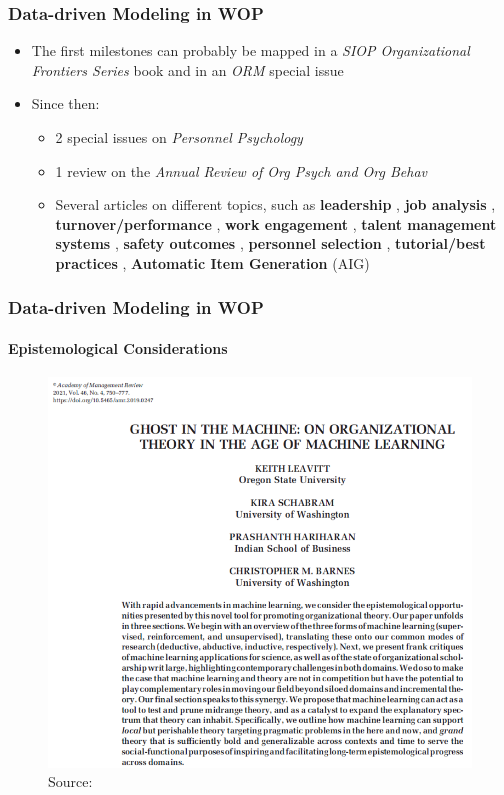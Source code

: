 \documentclass{beamer}
\begin{document}
\begin{frame}
	\frametitle{Data-driven Modeling in WOP}
	\begin{itemize}
		\item The first milestones can probably be mapped in a \textit{SIOP Organizational Frontiers Series} book {\scriptsize \parencite{tonidandel2016big}} and in an \textit{ORM} special issue {\scriptsize \parencite{tonidandel2018big}}
		\item Since then:
		\begin{itemize}
			\item 2 special issues on \textit{Personnel Psychology} {\scriptsize \parencite{campion2023machine, woo2024}}
			\item 1 review on the \textit{Annual Review of Org Psych and Org Behav}  {\scriptsize \parencite{oswald2020big}}
			\item Several articles on different topics, such as
			\textbf{leadership} {\scriptsize \parencite{tonidandel2022leadersh}}, 
			\textbf{job analysis} {\scriptsize \parencite{putka2023evaluating}}, 
			\textbf{turnover/performance}  {\scriptsize \parencite{sajjadiani2019using}}, 
			\textbf{work engagement} {\scriptsize \parencite{vanRoekel2024textWorkEngag}},
			\textbf{talent management systems} {\scriptsize \parencite{gonzalez2019talent}}, 
			\textbf{safety outcomes} {\scriptsize \parencite{kumar2024safety}}, 
			\textbf{personnel selection} {\scriptsize \parencite{landers2023simulation, koenig_Tonidandel2023}}, 
			\textbf{tutorial/best practices} {\scriptsize \parencite{putka2018modern, sheetal2023LongitudinalML}}, 
			\textbf{Automatic Item Generation} (AIG) {\scriptsize \parencite{lee2023AIG}}
		\end{itemize}
	\end{itemize}
\end{frame}


\begin{frame}
	\frametitle{Data-driven Modeling in WOP}
	\framesubtitle{Epistemological Considerations}
	\begin{figure}
		\centering
		\includegraphics[width=0.6\linewidth]{figs/Leavitt_2021.png}
		\caption{Source: \textcite[]{leavitt2021}}
		\label{fig:leavitt2021}
	\end{figure}
\end{frame}
\end{document}
